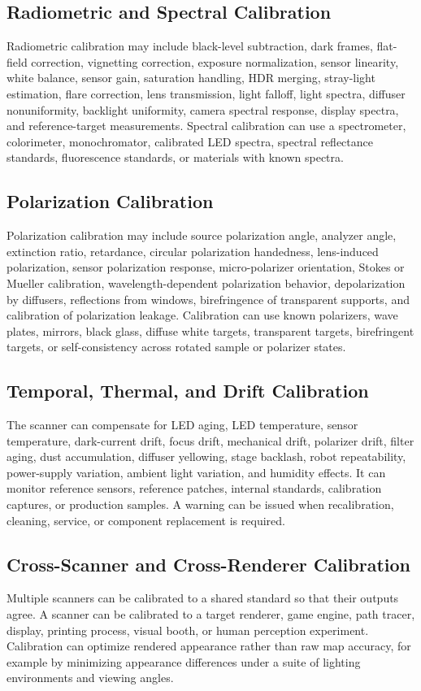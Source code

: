 \documentclass[11pt, twoside, listof=totocnumbered, bibliography=totocnumbered]{scrartcl}
\begin{document}
	\subsection{Radiometric and Spectral Calibration}
	Radiometric calibration may include black-level subtraction, dark frames, flat-field correction, vignetting correction, exposure normalization, sensor linearity, white balance, sensor gain, saturation handling, HDR merging, stray-light estimation, flare correction, lens transmission, light falloff, light spectra, diffuser nonuniformity, backlight uniformity, camera spectral response, display spectra, and reference-target measurements. Spectral calibration can use a spectrometer, colorimeter, monochromator, calibrated LED spectra, spectral reflectance standards, fluorescence standards, or materials with known spectra.
	
	\subsection{Polarization Calibration}
	Polarization calibration may include source polarization angle, analyzer angle, extinction ratio, retardance, circular polarization handedness, lens-induced polarization, sensor polarization response, micro-polarizer orientation, Stokes or Mueller calibration, wavelength-dependent polarization behavior, depolarization by diffusers, reflections from windows, birefringence of transparent supports, and calibration of polarization leakage. Calibration can use known polarizers, wave plates, mirrors, black glass, diffuse white targets, transparent targets, birefringent targets, or self-consistency across rotated sample or polarizer states.
	
	\subsection{Temporal, Thermal, and Drift Calibration}
	The scanner can compensate for LED aging, LED temperature, sensor temperature, dark-current drift, focus drift, mechanical drift, polarizer drift, filter aging, dust accumulation, diffuser yellowing, stage backlash, robot repeatability, power-supply variation, ambient light variation, and humidity effects. It can monitor reference sensors, reference patches, internal standards, calibration captures, or production samples. A warning can be issued when recalibration, cleaning, service, or component replacement is required.
	
	\subsection{Cross-Scanner and Cross-Renderer Calibration}
	Multiple scanners can be calibrated to a shared standard so that their outputs agree. A scanner can be calibrated to a target renderer, game engine, path tracer, display, printing process, visual booth, or human perception experiment. Calibration can optimize rendered appearance rather than raw map accuracy, for example by minimizing appearance differences under a suite of lighting environments and viewing angles.
	
\end{document}
